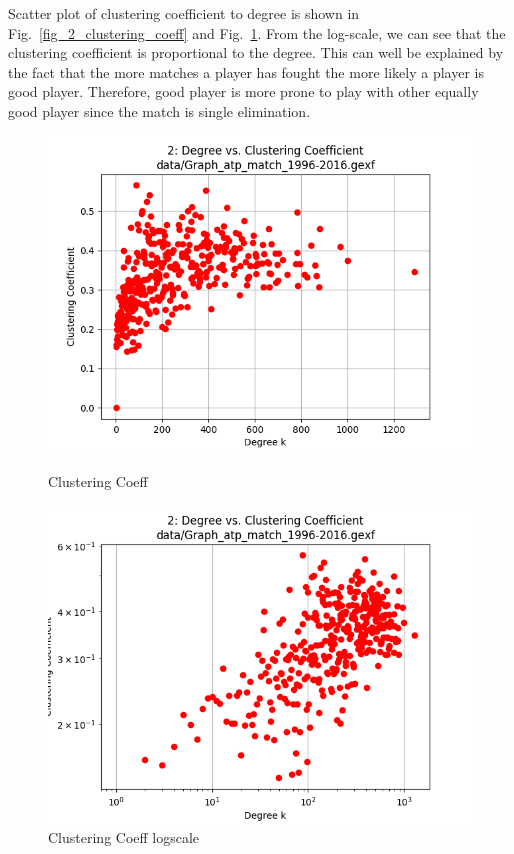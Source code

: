 \documentclass[runningheads]{llncs}
\begin{document}
Scatter plot of clustering coefficient to degree is shown in Fig.~\ref{fig_2_clustering_coeff} and Fig.~\ref{fig_2_clustering_coeff_log}. From the log-scale, we can see that the clustering coefficient is proportional to the degree. This can well be explained by the fact that the more matches a player has fought the more likely a player is good player. Therefore, good player is more prone to play with other equally good player since the match is single elimination.

\begin{figure}
    \centering
    \begin{minipage}{0.5\textwidth}
        \centering
        \includegraphics[width=\textwidth]{2_clustering_coeff} %
        \caption{Clustering Coeff}
        \label{fig_2_clustering_coeff}
    \end{minipage}\hfill
    \begin{minipage}{0.5\textwidth}
        \centering
        \includegraphics[width=\textwidth]{2_clustering_coeff_log} %
        \caption{Clustering Coeff logscale}
        \label{fig_2_clustering_coeff_log}
    \end{minipage}
\end{figure}
\end{document}
